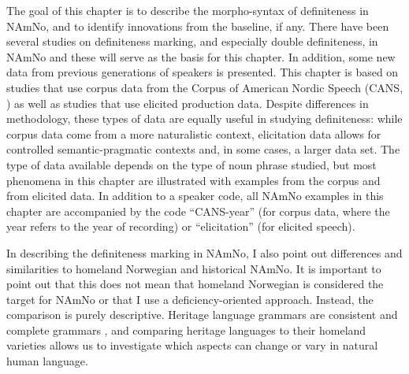 \documentclass[output=paper]{langscibook}
\begin{document}
The goal of this chapter is to describe the morpho-syntax of definiteness in NAmNo, and to identify innovations from the baseline, if any. There have been several studies on definiteness marking, and especially double definiteness, in NAmNo and these will serve as the basis for this chapter. In addition, some new data from previous generations of speakers is presented. This chapter is based on studies that use corpus data from the Corpus of American Nordic Speech (CANS, \citealt{Johannessen2015CANS}) as well as studies that use elicited production data. Despite differences in methodology, these types of data are equally useful in studying definiteness: while corpus data come from a more naturalistic context, elicitation data allows for controlled semantic-pragmatic contexts and, in some cases, a larger data set. The type of data available depends on the type of noun phrase studied, but most phenomena in this chapter are illustrated with examples from the corpus and from elicited data. In addition to a speaker code, all NAmNo examples in this chapter are accompanied by the code ``CANS-year'' (for corpus data, where the year refers to the year of recording) or ``elicitation'' (for elicited speech).
 
In describing the definiteness marking in NAmNo, I also point out differences and similarities to homeland Norwegian and historical NAmNo. It is important to point out that this does not mean that homeland Norwegian is considered the target for NAmNo or that I use a deficiency-oriented approach. Instead, the comparison is purely descriptive. Heritage language grammars are consistent and complete grammars \citep[25, 350]{Polinsky2018}, and comparing heritage languages to their homeland varieties allows us to investigate which aspects can change or vary in natural human language.
 
\end{document}
